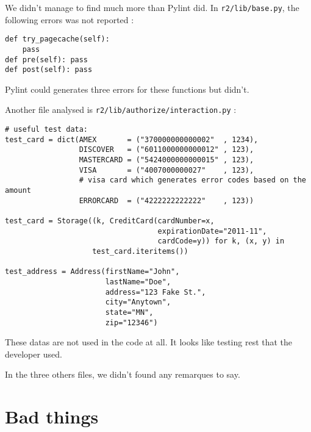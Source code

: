 \documentclass[11pt, a4paper]{article}
\newcommand{\pyl}{\textsf{Pylint}}
\begin{document}
We didn't manage to find much more than Pylint did. In \texttt{r2/lib/base.py}, the following errors was not reported :

\begin{lstlisting}[caption= 3 useless functions]
def try_pagecache(self):
    pass
def pre(self): pass
def post(self): pass
\end{lstlisting}

\pyl{} could generates three errors for these functions but didn't.


Another file analysed is \texttt{r2/lib/authorize/interaction.py} :

\begin{lstlisting}[caption= test data in the file..]
# useful test data:
test_card = dict(AMEX       = ("370000000000002"  , 1234),
                 DISCOVER   = ("6011000000000012" , 123),
                 MASTERCARD = ("5424000000000015" , 123),
                 VISA       = ("4007000000027"    , 123),
                 # visa card which generates error codes based on the amount
                 ERRORCARD  = ("4222222222222"    , 123))

test_card = Storage((k, CreditCard(cardNumber=x,
                                   expirationDate="2011-11",
                                   cardCode=y)) for k, (x, y) in
                    test_card.iteritems())

test_address = Address(firstName="John",
                       lastName="Doe",
                       address="123 Fake St.",
                       city="Anytown",
                       state="MN",
                       zip="12346")
\end{lstlisting}

These datas are not used in the code at all. It looks like testing rest that the developer used.

In the three others files, we didn't found any remarques to say.


\section{Bad things}
\end{document}
